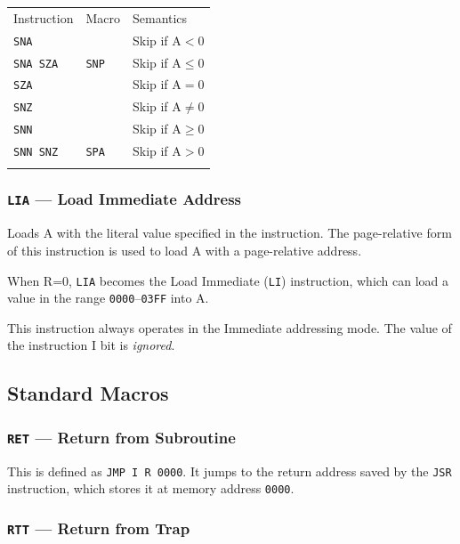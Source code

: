 \documentclass[11pt,a4paper,twocolumns]{article}
\begin{document}
\vspace{1em}\noindent\begin{center}
\begin{tabular}{lll}
  Instruction & Macro & Semantics \\\noalign{\smallskip}\hline\noalign{\smallskip}
  {\tt SNA }     &           & Skip if $\mbox{A} < 0$ \\
  {\tt SNA SZA } & {\tt SNP} & Skip if $\mbox{A} \leq 0$ \\
  {\tt SZA }     &           & Skip if $\mbox{A} = 0$ \\
  {\tt SNZ }     &           & Skip if $\mbox{A} \not= 0$ \\
  {\tt SNN }     &           & Skip if $\mbox{A} \geq 0$ \\
  {\tt SNN SNZ } & {\tt SPA} & Skip if $\mbox{A} > 0$ \\
  \noalign{\smallskip}\hline\noalign{\smallskip}
\end{tabular}
\end{center}\vspace{1em}

\subsubsection{{\tt LIA} — Load Immediate Address}
\label{sec-lia}
\label{sec-li}

Loads A with the literal value specified in the instruction. The
page-relative form of this instruction is used to load A with a
page-relative address.

When R=0, {\tt LIA} becomes the Load Immediate ({\tt LI}) instruction,
which can load a value in the range {\tt 0000}–{\tt 03FF} into A.

This instruction always operates in the Immediate addressing mode. The
value of the instruction I bit is {\em ignored}.

\subsection{Standard Macros}
\subsubsection{{\tt RET} — Return from Subroutine}

This is defined as {\tt JMP I R 0000}. It jumps to the return address
saved by the {\tt JSR} instruction, which stores it at memory address
{\tt 0000}.

\subsubsection{{\tt RTT} — Return from Trap} 
\end{document}
